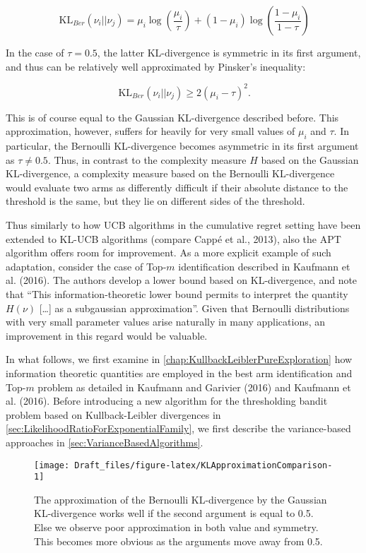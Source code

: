 \documentclass[11pt,]{article}
\newcommand{\KL}{\,\text{KL}}
\begin{document}
\[
\KL_{Ber}(\nu_i||\nu_j) = \mu_i \log(\frac{\mu_i}{\tau}) + (1-\mu_i) \log(\frac{1-\mu_i}{1-\tau})
\]

In the case of \(\tau = 0.5\), the latter KL-divergence is symmetric in
its first argument, and thus can be relatively well approximated by
Pinsker's inequality:

\[
\KL_{Ber}(\nu_i||\nu_j) \geq 2(\mu_i - \tau)^2.
\]

This is of course equal to the Gaussian KL-divergence described before.
This approximation, however, suffers for heavily for very small values
of \(\mu_i\) and \(\tau\). In particular, the Bernoulli KL-divergence
becomes asymmetric in its first argument as \(\tau \neq 0.5\). Thus, in
contrast to the complexity measure \(H\) based on the Gaussian
KL-divergence, a complexity measure based on the Bernoulli KL-divergence
would evaluate two arms as differently difficult if their absolute
distance to the threshold is the same, but they lie on different sides
of the threshold.

Thus similarly to how UCB algorithms in the cumulative regret setting
have been extended to KL-UCB algorithms (compare Cappé et al., 2013),
also the APT algorithm offers room for improvement. As a more explicit
example of such adaptation, consider the case of Top-\(m\)
identification described in Kaufmann et al. (2016). The authors develop
a lower bound based on KL-divergence, and note that ``This
information-theoretic lower bound permits to interpret the quantity
\(H(\nu)\) {[}\ldots{}{]} as a subgaussian approximation''. Given that
Bernoulli distributions with very small parameter values arise naturally
in many applications, an improvement in this regard would be valuable.

In what follows, we first examine in
\autoref{chap:KullbackLeiblerPureExploration} how information theoretic
quantities are employed in the best arm identification and Top-\(m\)
problem as detailed in Kaufmann and Garivier (2016) and Kaufmann et al.
(2016). Before introducing a new algorithm for the thresholding bandit
problem based on Kullback-Leibler divergences in
\autoref{sec:LikelihoodRatioForExponentialFamily}, we first describe the
variance-based approaches in \autoref{sec:VarianceBasedAlgorithms}.

\begin{figure}

{\centering \texttt{[image: Draft\_files/figure-latex/KLApproximationComparison-1]} 

}

\caption{The approximation of the Bernoulli KL-divergence by the Gaussian KL-divergence works well if the second argument is equal to 0.5. Else we observe poor approximation in both value and symmetry. This becomes more obvious as the arguments move away from 0.5.}\label{fig:KLApproximationComparison}
\end{figure}
\end{document}
